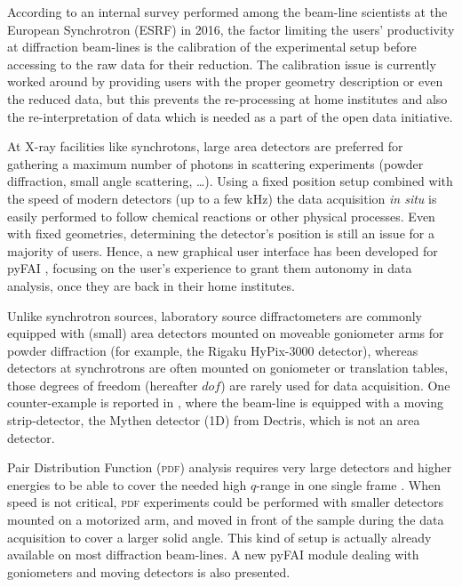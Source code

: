 \documentclass[preprint]{iucr}              %
\begin{document}
According to an internal survey performed among the beam-line scientists at
the European Synchrotron (ESRF) in 2016, the factor limiting the users'
productivity at diffraction beam-lines is the calibration of the experimental
setup before accessing to the raw data for their reduction. 
The calibration issue is currently worked around by providing users with the
proper geometry description or even the reduced data, but this prevents the
re-processing at home institutes and also the re-interpretation of data which
is needed as a part of the open data initiative.

At X-ray facilities like synchrotons, large area detectors are 
preferred for gathering a maximum number of photons in
scattering experiments (powder diffraction, small angle
scattering, \ldots).
Using a fixed position setup combined with the speed of modern detectors (up
to a few kHz) the data acquisition \textit{in situ} is easily
performed to follow chemical reactions or other physical processes.
Even with fixed geometries, determining the detector's position is
still an issue for a majority of users. 
Hence, a new graphical user interface has been developed for pyFAI
\cite{pyFAI_0.18}, focusing on the user's experience to grant them autonomy in
data analysis, once they are back in their home institutes.

Unlike synchrotron sources, laboratory source diffractometers
are commonly equipped with (small) area detectors mounted on moveable goniometer
arms for powder diffraction (for example, the Rigaku HyPix-3000 detector),
whereas detectors at synchrotrons are often mounted on goniometer or
translation tables, those degrees of freedom (hereafter $dof$) are rarely used for data
acquisition.
One counter-example is reported in \cite{Gao:kc5032}, where the beam-line
is equipped with a moving strip-detector, the Mythen detector (1D) from Dectris,
which is not an area detector.




Pair Distribution Function (\textsc{pdf}) analysis requires very large
detectors and higher energies to be able to cover the needed high $q$-range in
one single frame \cite{Chupas:wf5000}.
When speed is not critical, \textsc{pdf} experiments could be performed
with smaller detectors mounted on a motorized arm, and moved in front of
the sample during the data acquisition to cover a larger solid angle. 
This kind of setup is actually already available on most diffraction
beam-lines. 
A new pyFAI module dealing with goniometers and moving detectors is also presented.
\end{document}
